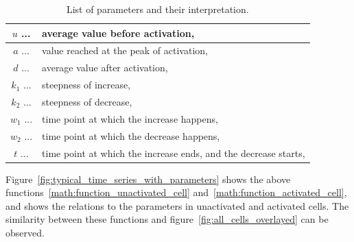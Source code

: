 \begin{table}[h!]
	\centering
	\begin{tabular}{|cl|}
		\hline
		$u$ ... & average value before activation, \\
		\hline
		$a$ ... & value reached at the peak of activation, \\
		\hline
		$d$ ... & average value after activation, \\
		\hline
		$k_1$ ... & steepness of increase, \\
		\hline
		$k_2$ ... & steepness of decrease, \\
		\hline
		$w_1$ ... & time point at which the increase happens, \\
		\hline
		$w_2$ ... & time point at which the decrease happens, \\
		\hline
		$t$ ... & time point at which the increase ends, and the decrease starts, \\
		\hline
	\end{tabular}
	\caption{List of parameters and their interpretation.}
	\label{tab:parameters}
\end{table}

Figure~\ref{fig:typical_time_series_with_parameters} shows the above functions~\ref{math:function_unactivated_cell} and~\ref{math:function_activated_cell}, and shows the relations to the parameters in unactivated and activated cells. The similarity between these functions and figure~\ref{fig:all_cells_overlayed} can be observed.


